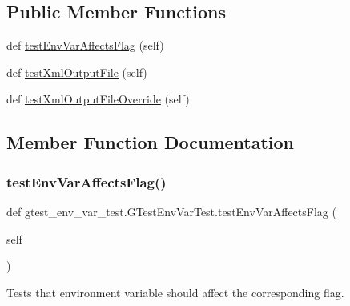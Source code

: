 \subsection*{Public Member Functions}
\begin{DoxyCompactItemize}
\item 
def \hyperlink{classgtest__env__var__test_1_1_g_test_env_var_test_ad169061caa22a6cd510535d6da94b97e}{test\+Env\+Var\+Affects\+Flag} (self)
\item 
def \hyperlink{classgtest__env__var__test_1_1_g_test_env_var_test_ae2f623209c115e094965e606cd34eec4}{test\+Xml\+Output\+File} (self)
\item 
def \hyperlink{classgtest__env__var__test_1_1_g_test_env_var_test_ae41b9b9569eb327d5886cb811c2995a7}{test\+Xml\+Output\+File\+Override} (self)
\end{DoxyCompactItemize}


\subsection{Member Function Documentation}
\mbox{\label{classgtest__env__var__test_1_1_g_test_env_var_test_ad169061caa22a6cd510535d6da94b97e}} 
\subsubsection{\texorpdfstring{test\+Env\+Var\+Affects\+Flag()}{testEnvVarAffectsFlag()}}
{\footnotesize\ttfamily def gtest\+\_\+env\+\_\+var\+\_\+test.\+G\+Test\+Env\+Var\+Test.\+test\+Env\+Var\+Affects\+Flag (\begin{DoxyParamCaption}\item[{}]{self }\end{DoxyParamCaption})}

\begin{DoxyVerb}Tests that environment variable should affect the corresponding flag.\end{DoxyVerb}
 \mbox{\label{classgtest__env__var__test_1_1_g_test_env_var_test_ae2f623209c115e094965e606cd34eec4}} 
